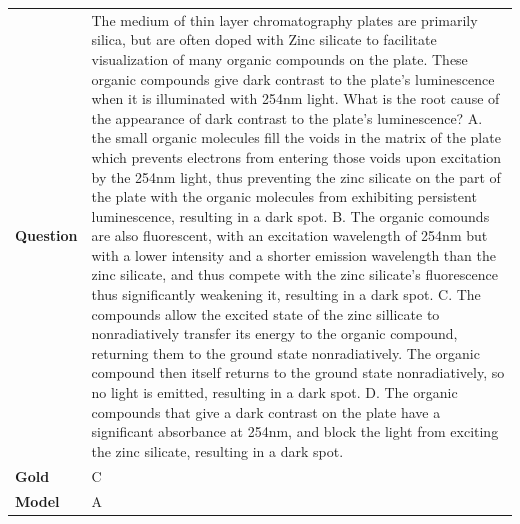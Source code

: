 \begin{longtable}{@{}l p{13cm}@{}}
  \textbf{Question}  & The medium of thin layer chromatography plates are primarily silica, but are often doped with Zinc silicate to facilitate visualization of many organic compounds on the plate. These organic compounds give dark contrast to the plate's luminescence when it is illuminated with 254nm light. What is the root cause of the appearance of dark contrast to the plate's luminescence? \newline A. the small organic molecules fill the voids in the matrix of the plate which prevents electrons from entering those voids upon excitation by the 254nm light, thus preventing the zinc silicate on the part of the plate with the organic molecules from exhibiting persistent luminescence, resulting in a dark spot. \newline B. The organic comounds are also fluorescent, with an excitation wavelength of 254nm but with a lower intensity and a shorter emission wavelength than the zinc silicate, and thus compete with the zinc silicate's fluorescence thus significantly weakening it, resulting in a dark spot. \newline C. The compounds allow the excited state of the zinc sillicate to nonradiatively transfer its energy to the organic compound, returning them to the ground state nonradiatively. The organic compound then itself returns to the ground state nonradiatively, so no light is emitted, resulting in a dark spot. \newline D. The organic compounds that give a dark contrast on the plate have a significant absorbance at 254nm, and block the light from exciting the zinc silicate, resulting in a dark spot.   \\
  \textbf{Gold}      & C       \\
  \textbf{Model}     & A  \\

\end{longtable}
